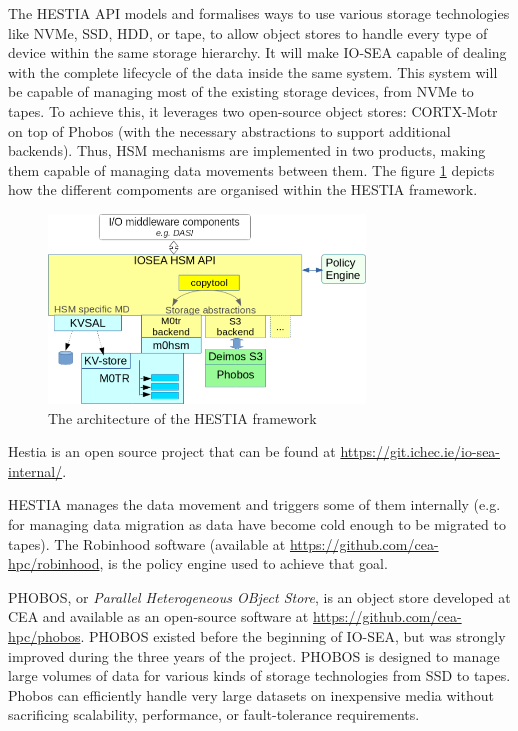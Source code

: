The HESTIA API models and formalises ways to use various storage technologies  like NVMe, SSD, HDD, or tape, to
allow object stores to handle every type of device within the same storage hierarchy. It will make IO-SEA 
capable of dealing with the complete lifecycle of the data inside the same system. This system will be capable of managing most of the existing storage devices, from NVMe to tapes. To achieve this, it leverages two open-source
object stores: CORTX-Motr on top of Phobos (with the necessary abstractions to support additional backends).
Thus, HSM mechanisms are implemented in two products, making them capable of managing data movements between
them. The figure \ref{fig:hestia} depicts how the different compoments are organised within the HESTIA 
framework. 

\begin{figure}[H]
    \centering
    \includegraphics[width=0.75\textwidth]{FIGS/hestia.png}
    \caption[HESTIA software architecture]{ The architecture of the HESTIA framework}
    \label{fig:hestia}
\end{figure}

Hestia is an open source project that can be found at \url{https://git.ichec.ie/io-sea-internal/}.

HESTIA manages the data movement and triggers some of them internally (e.g. for managing data migration as data
have become cold enough to be migrated to tapes). The Robinhood software (available at
\url{https://github.com/cea-hpc/robinhood}, is the policy engine used to achieve that goal. 

PHOBOS, or \textit{Parallel Heterogeneous OBject Store}, is an object store developed at CEA and available as an
open-source software at \url{https://github.com/cea-hpc/phobos}. PHOBOS existed before the beginning of IO-SEA,
but was strongly improved during the three years of the project. PHOBOS is designed to manage large volumes of
data for various kinds of storage technologies from SSD to tapes. Phobos can efficiently handle very large
datasets on inexpensive media without sacrificing scalability, performance, or fault-tolerance requirements.

